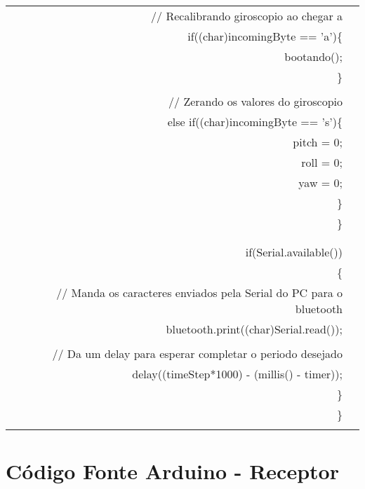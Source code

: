 \begin{longtable}{Rp{15cm}}
  \\  
\qquad \qquad    // Recalibrando giroscopio ao chegar a \\
\qquad \qquad    if((char)incomingByte == 'a')\{ \\
\qquad \qquad \qquad       bootando();    \\
\qquad \qquad    \} \\
\\
\qquad \qquad   // Zerando os valores do giroscopio \\
\qquad \qquad   else if((char)incomingByte == 's')\{ \\
\qquad \qquad \qquad      pitch = 0; \\
\qquad \qquad \qquad      roll = 0; \\
\qquad \qquad \qquad      yaw = 0;  \\
\qquad \qquad    \}  \\  
\qquad  \} \\
  \\
  \\
\qquad  if(Serial.available())  \\
\qquad  \{ \\
\qquad \qquad        //  Manda os caracteres enviados pela Serial do PC para o  bluetooth \\
\qquad \qquad        bluetooth.print((char)Serial.read()); \\     
\\
\qquad \qquad  // Da um delay para esperar completar o periodo desejado \\
\qquad \qquad  delay((timeStep*1000) - (millis() - timer)); \\
\quad  \} \\
\} \\

\\


 \hline
 \end{longtable}


\chapter{Código Fonte Arduino - Receptor}
  \label{app:apendiceB}
    

